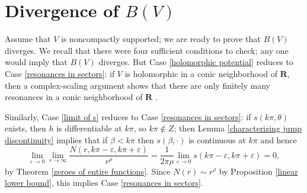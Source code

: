 \documentclass[reqno,12pt,letterpaper]{amsart}
\newcommand{\RR}{\mathbf{R}}
\newcommand{\CC}{\mathbf{C}}
\DeclareMathOperator{\supp}{supp}
\newtheorem{lemma}[theorem]{Lemma}
\theoremstyle{definition}
\begin{document}
\section{Divergence of $B(V)$}
\label{divergence section}
Assume that $V$ is noncompactly supported; we are ready to prove that $B(V)$ diverges. We recall that there were four sufficient conditions to check; any one would imply that $B(V)$ diverges.
But Case \ref{holomorphic potential} reduces to Case \ref{resonances in sectors}: if $V$ is holomorphic in a conic neighborhood of $\RR$, then a complex-scaling argument shows that there are only finitely many resonances in a conic neighborhood of $\RR$ \cite[Corollary 12.14]{sjostrand2002lectures}.

Similarly, Case \ref{limit of s} reduces to Case \ref{resonances in sectors}: if $s(k\pi, \theta)$ exists, then $h$ is differentiable at $k\pi$, so $k\pi \notin Z$;
then Lemma \ref{characterizing jump discontinuity} implies that if $\beta < k\pi$ then $s(\beta, \cdot)$ is continuous at $k\pi$ and hence
$$\lim_{\varepsilon \to 0} \lim_{r \to \infty} \frac{N(r, k\pi - \varepsilon, k\pi + \varepsilon)}{r^\rho} = \frac{1}{2\pi\rho} \lim_{\varepsilon \to 0} s(k\pi - \varepsilon, k\pi + \varepsilon) = 0,$$
by Theorem \ref{zeroes of entire functions}. Since $N(r) \sim r^\rho$ by Proposition \ref{linear lower bound}, this implies Case \ref{resonances in sectors}.
%

\end{document}
